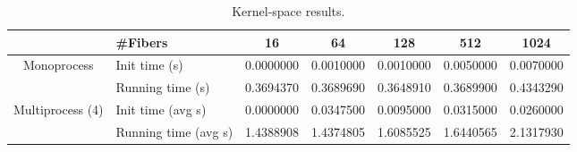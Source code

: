 \documentclass[11pt]{article}
\begin{document}
\begin{center}
\begin{table}[H]
\begin{tabular}{|c|l|c|c|c|c|c|}
\hline
\multicolumn{1}{|l|}{}            & \#Fibers             & 16        & 64        & 128       & 512       & 1024      \\ \hline
\multirow{2}{*}{Monoprocess}      & Init time (s)        & 0.0000000 & 0.0010000 & 0.0010000 & 0.0050000 & 0.0070000 \\ \cline{2-7} 
                                  & Running time (s)     & 0.3694370 & 0.3689690 & 0.3648910 & 0.3689900 & 0.4343290 \\ \hline
\multirow{2}{*}{Multiprocess (4)} & Init time (avg s)    & 0.0000000 & 0.0347500 & 0.0095000 & 0.0315000 & 0.0260000 \\ \cline{2-7} 
                                  & Running time (avg s) & 1.4388908 & 1.4374805 & 1.6085525 & 1.6440565 & 2.1317930 \\ \hline
\end{tabular}
\caption{Kernel-space results.}
\label{table:t4}
\end{table}
\end{center}
\end{document}
